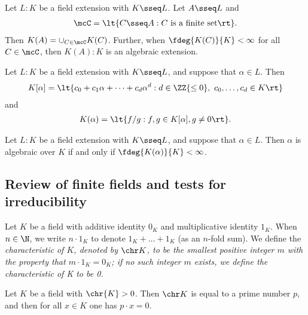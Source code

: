\documentclass[a4paper]{article}
\begin{document}
\begin{tproposition}
  Let \( L:K \) be a field extension with \( K\sseq L \).
  Let \( A\sseq L \) and \begin{align*}
    \mcC=\lt\{ C\sseq A : C \text{ is a finite set} \rt\}.
  \end{align*}
  Then \( K(A)=\cup_{C\in\mcC}K(C) \).
  Further, when \( \fdeg{K(C)}{K}<\infty \) for all \( C\in \mcC \), then \( K(A):K \) is an algebraic extension.
\end{tproposition}

\begin{tproposition}
  Let \( L : K \) be a field extension with \( K \sseq L \), and suppose that \( \alpha\in L \).
  Then \begin{align*}
    K[\alpha] = \lt\{ c_0 + c_1\alpha+\cdots+c_d \alpha^d : d\in \ZZ{\leq 0},\ c_0,\ldots,c_d\in K \rt\}
  \end{align*}
  and \begin{align*}
    K(\alpha) = \lt\{ f/g : f,g\in K[\alpha], g\neq 0 \rt\}.
  \end{align*}
\end{tproposition}

\begin{tproposition}
  Let \( L : K \) be a field extension with \( K \sseq L \), and suppose that \( \alpha\in L \).
  Then \( \alpha \) is algebraic over \( K \) if and only if \( \fdeg{K(\alpha)}{K}<\infty \).
\end{tproposition}

\subsection{Review of finite fields and tests for irreducibility}
\begin{tdefinition}[Characteristic]
  Let \( K \) be a field with additive identity \( 0_K \) and multiplicative identity \( 1_K \).
  When \( n\in \N \), we write \( n\cdot 1_K \) to denote \( 1_K+\ldots+ 1_K \) (as an \( n \)-fold sum).
  We define the \it{characteristic} of \( K \), denoted by \( \chr K \), to be the smallest positive integer \( m \) with the property that \( m\cdot 1_K = 0_K \);
  if no such integer \( m \) exists, we define the characteristic of K to be 0.
\end{tdefinition}

\begin{tproposition}
  Let \( K \) be a field with \( \chr{K} > 0 \). Then \( \chr K \) is equal to a prime number \( p \), and then for all \( x\in K \) one has \( p\cdot x=0 \).
\end{tproposition}
\end{document}
